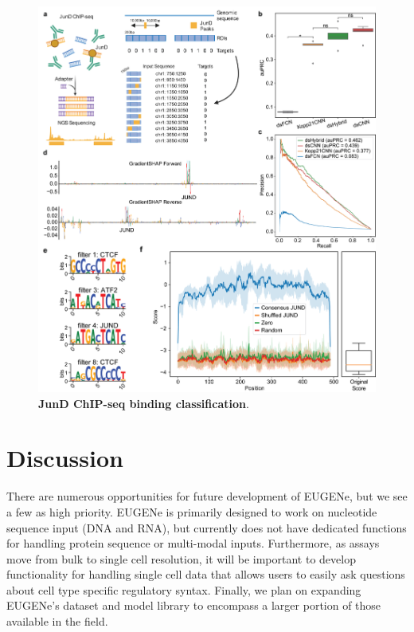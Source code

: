 \begin{figure}[!htbp]
    \centering
    \includegraphics[height=0.8\textheight, keepaspectratio]{1_figures-and-files/extended_data_figure2.png}
    \caption[JunD ChIP-seq binding classification]{\textbf{JunD ChIP-seq binding classification}.}
    \label{fig:1 Figure 4}
\end{figure}

\clearpage

\section{Discussion}

There are numerous opportunities for future development of EUGENe, but we see a few as high priority. EUGENe is primarily designed to work on nucleotide sequence input (DNA and RNA), but currently does not have dedicated functions for handling protein sequence or multi-modal inputs. Furthermore, as assays move from bulk to single cell resolution, it will be important to develop functionality for handling single cell data that allows users to easily ask questions about cell type specific regulatory syntax. Finally, we plan on expanding EUGENe’s dataset and model library to encompass a larger portion of those available in the field.

